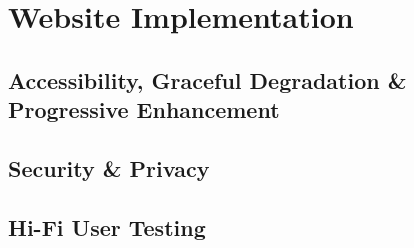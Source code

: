 
\section{Website Implementation}
\subsection{Accessibility, Graceful Degradation \& Progressive Enhancement}

\subsection{Security \& Privacy}

\subsection{Hi-Fi User Testing}
